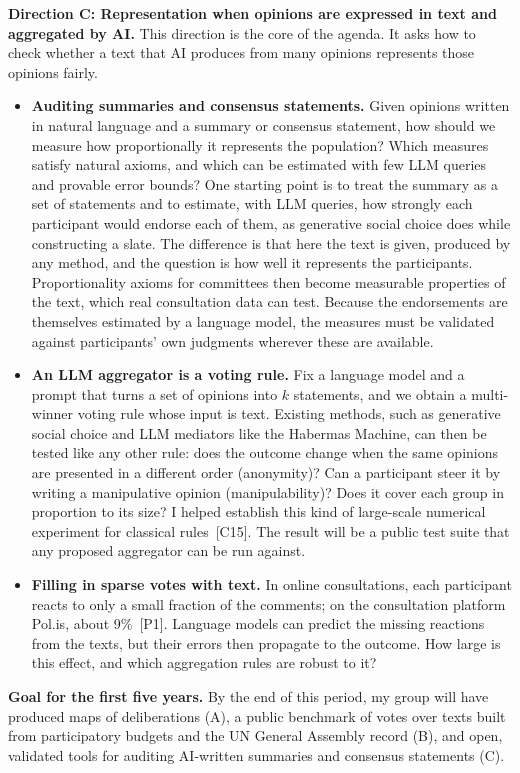 \documentclass[11pt,a4paper]{article}
\newcommand{\direction}[1]{\textbf{\color{accent}#1}}
\newcommand{\pub}[1]{~[#1]}
\newcommand{\problem}[1]{\item \textbf{#1}}
\begin{document}
\direction{Direction C: Representation when opinions are expressed in text and aggregated by AI.}
This direction is the core of the agenda. It asks how to check whether a text
that AI produces from many opinions represents those opinions fairly.
\begin{itemize}
  \problem{Auditing summaries and consensus statements.} Given opinions
  written in natural language and a summary or consensus statement, how
  should we measure how proportionally it represents the population? Which
  measures satisfy natural axioms, and which can be estimated with few LLM
  queries and provable error bounds? One starting point is to
  treat the summary as a set of statements and to estimate, with LLM queries,
  how strongly each participant would endorse each of them, as generative
  social choice does while constructing a slate. The difference is that here
  the text is given, produced by any method, and the question is how well it
  represents the participants. Proportionality axioms for committees then
  become measurable properties of the text, which real consultation data can
  test.
  Because the endorsements are themselves estimated by a language model, the
  measures must be validated against participants' own judgments wherever
  these are available.
  \problem{An LLM aggregator is a voting rule.} Fix a language model and a
  prompt that turns a set of opinions into $k$ statements, and we obtain a
  multi-winner voting rule whose input is text. Existing methods, such as
  generative social choice and LLM mediators like the Habermas Machine, can
  then be tested like any other rule: does the outcome change when the same
  opinions are presented in a different order (anonymity)? Can a participant
  steer it by writing a manipulative opinion (manipulability)? Does it cover
  each group in proportion to its size? I helped establish this kind of
  large-scale numerical experiment for classical rules\pub{C15}. The result
  will be a public test suite that any proposed aggregator can be run against.
  \problem{Filling in sparse votes with text.} In online consultations, each
  participant reacts to only a small fraction of the comments; on the
  consultation platform Pol.is, about 9\%\pub{P1}. Language models can predict the missing reactions from
  the texts, but their errors then propagate to the outcome. How large is this
  effect, and which aggregation rules are robust to it?
\end{itemize}

\textbf{Goal for the first five years.} By the end of this period, my group
will have produced maps of deliberations (A), a public benchmark of votes
over texts built from participatory budgets and the UN General Assembly record
(B), and open, validated tools for auditing AI-written summaries and consensus
statements (C).
\end{document}
